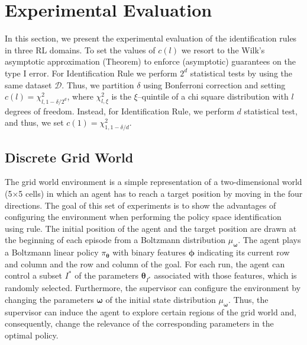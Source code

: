 \documentclass[letterpaper]{article} %
\begin{document}
\section{Experimental Evaluation}
In this section, we present the experimental evaluation of the identification rules in three RL domains.
To set the values of $c(l)$ we resort to the Wilk's asymptotic approximation (Theorem) to enforce (asymptotic) guarantees on the type I error. For Identification Rule we perform $2^d$ statistical tests by using the same dataset $\mathcal{D}$. Thus, we partition $\delta$ using Bonferroni correction and setting $c(l) = \chi^2_{l,1-{\delta}/{2^d}}$, where $\chi^2_{l,\xi}$ is the $\xi$--quintile of a chi square distribution with $l$ degrees of freedom. Instead, for Identification Rule, we perform $d$ statistical test, and thus, we set $c(1) = \chi^2_{1,1-{\delta}/{d}}$.

\subsection{Discrete Grid World}
The grid world environment is a simple representation of a two-dimensional world (5$\times$5 cells) in which an agent has to reach a target position by moving in the four directions. The goal of this set of experiments is to show the advantages of configuring the environment when performing the policy space identification using rule. The initial position of the agent and the target position are drawn at the beginning of each episode from a Boltzmann distribution $\mu_{\mathbf{\omega}}$. The agent plays a Boltzmann linear policy $\pi_{\mathbf{\theta}}$ with binary features $\mathbf{\phi}$ indicating its current row and column and the row and column of the goal. For each run, the agent can control a subset $I^*$ of the parameters $\mathbf{\theta}_{I^*}$ associated with those features, which is randomly selected. Furthermore, the supervisor can configure the environment by changing the parameters $\mathbf{\omega}$ of the initial state distribution $\mu_{\mathbf{\omega}}$. Thus, the supervisor can induce the agent to explore certain regions of the grid world and, consequently, change the relevance of the corresponding parameters in the optimal policy.
\end{document}
